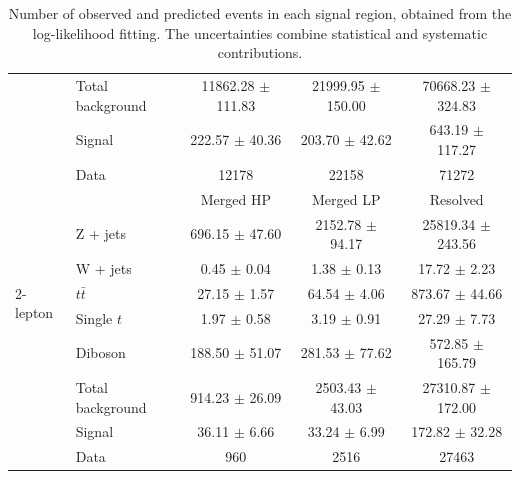 \begin{table}[htbp]
\begin{center}
\begin{tabular}{| l | l | c | c | c |}
                   & Total background    & 11862.28 $\pm$ 111.83            &   21999.95 $\pm$ 150.00         & 70668.23 $\pm$ 324.83\\ \cline{2-5}
                   & Signal       & 222.57 $\pm$ 40.36           & 203.70 $\pm$ 42.62           &643.19 $\pm$ 117.27\\ \cline{2-5}
                   & Data         & 12178           & 22158           &71272\\ \hline \hline
\multirow{7}{*}{2-lepton} &     & Merged HP  & Merged LP               & Resolved  \\ \cline{2-5}
        & Z + jets    &  696.15 $\pm$ 47.60  & 2152.78 $\pm$ 94.17     & 25819.34 $\pm$ 243.56\\ 
        & W + jets    &  0.45 $\pm$ 0.04     & 1.38 $\pm$ 0.13         & 17.72 $\pm$ 2.23\\  
        & $t\bar{t}$  &  27.15 $\pm$ 1.57    & 64.54 $\pm$ 4.06        & 873.67 $\pm$ 44.66\\ 
        & Single $t$        &  1.97 $\pm$ 0.58     & 3.19 $\pm$ 0.91         & 27.29 $\pm$ 7.73\\ 
        & Diboson     &  188.50 $\pm$ 51.07  & 281.53 $\pm$ 77.62      & 572.85 $\pm$ 165.79\\ \cline{2-5}
        & Total background   &  914.23 $\pm$ 26.09  & 2503.43 $\pm$ 43.03  & 27310.87 $\pm$ 172.00\\ \cline{2-5}
        & Signal      &  36.11 $\pm$ 6.66    & 33.24 $\pm$ 6.99        & 172.82 $\pm$ 32.28\\ \cline{2-5}
        & Data        &  960                 & 2516                    & 27463\\ \hline 
\end{tabular}
\caption{\label{tab:postyields} Number of observed and predicted events in each signal region, obtained from the log-likelihood fitting. The uncertainties combine statistical and systematic contributions. }
\end{center}
\end{table}

